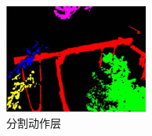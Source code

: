 \documentclass[xcolor=svgnames,serif,table,10pt]{beamer}
\begin{document}
\begin{frame}
\begin{columns}
    \includegraphics[width=\textwidth]{lag3.png}\\
    分割动作层
  \end{columns}


\end{frame}
\end{document}
